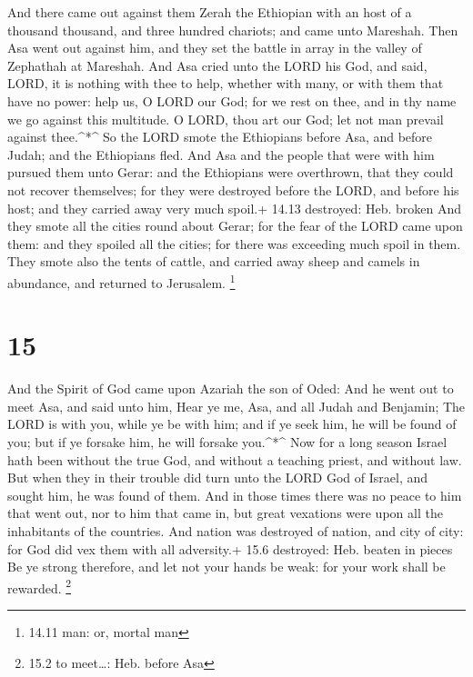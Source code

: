  And there came out against them Zerah the Ethiopian with an
host of a thousand thousand, and three hundred chariots; and came unto
Mareshah.  Then Asa went out against him, and they set the
battle in array in the valley of Zephathah at Mareshah. 
And Asa cried unto the LORD his God, and said, LORD, it is nothing with
thee to help, whether with many, or with them that have no power: help
us, O LORD our God; for we rest on thee, and in thy name we go against
this multitude. O LORD, thou art our God; let not man prevail against
thee.\^{}*\^{}  So the LORD smote the Ethiopians before
Asa, and before Judah; and the Ethiopians fled.  And Asa
and the people that were with him pursued them unto Gerar: and the
Ethiopians were overthrown, that they could not recover themselves; for
they were destroyed before the LORD, and before his host; and they
carried away very much spoil.+ 14.13 destroyed: Heb. broken
 And they smote all the cities round about Gerar; for the
fear of the LORD came upon them: and they spoiled all the cities; for
there was exceeding much spoil in them.  They smote also
the tents of cattle, and carried away sheep and camels in abundance, and
returned to Jerusalem. \footnote{14.11 man: or, mortal man}

\hypertarget{section-14}{%
\section{15}\label{section-14}}

 And the Spirit of God came upon Azariah the son of Oded:
 And he went out to meet Asa, and said unto him, Hear ye me,
Asa, and all Judah and Benjamin; The LORD is with you, while ye be with
him; and if ye seek him, he will be found of you; but if ye forsake him,
he will forsake you.\^{}*\^{}  Now for a long season Israel
hath been without the true God, and without a teaching priest, and
without law.  But when they in their trouble did turn unto
the LORD God of Israel, and sought him, he was found of them.
 And in those times there was no peace to him that went out,
nor to him that came in, but great vexations were upon all the
inhabitants of the countries.  And nation was destroyed of
nation, and city of city: for God did vex them with all adversity.+ 15.6
destroyed: Heb. beaten in pieces  Be ye strong therefore,
and let not your hands be weak: for your work shall be rewarded.
\footnote{15.2 to meet\ldots: Heb. before Asa}

